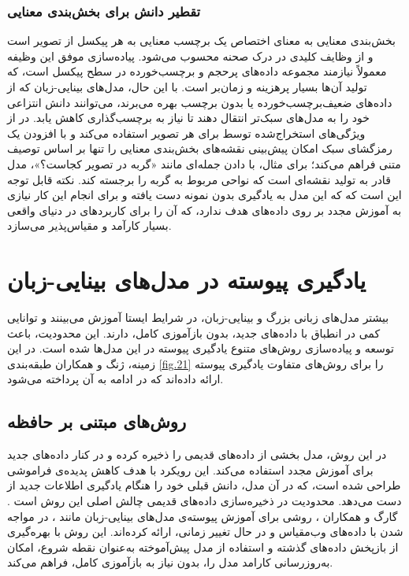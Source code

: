 \subsubsection{تقطیر دانش برای بخش‌بندی معنایی}
بخش‌بندی معنایی به معنای اختصاص یک برچسب معنایی به هر پیکسل از تصویر است و از وظایف کلیدی در درک صحنه محسوب می‌شود. پیاده‌سازی موفق این وظیفه معمولاً نیازمند مجموعه داده‌های پرحجم و برچسب‌خورده در سطح پیکسل است، که تولید آن‌ها بسیار پرهزینه و زمان‌بر است. با این حال، مدل‌های بینایی-زبان که از داده‌های ضعیف‌برچسب‌خورده یا بدون برچسب بهره می‌برند، می‌توانند دانش انتزاعی خود را به مدل‌های سبک‌تر انتقال دهند تا نیاز به برچسب‌گذاری کاهش یابد. در 
\cite{CLIPSeg}
از ویژگی‌های استخراج‌شده توسط
برای هر تصویر استفاده می‌کند و با افزودن یک رمزگشای سبک
امکان پیش‌بینی نقشه‌های بخش‌بندی معنایی را تنها بر اساس توصیف متنی
فراهم می‌کند؛ برای مثال، با دادن جمله‌ای مانند «گربه در تصویر کجاست؟»، مدل قادر به تولید نقشه‌ای است که نواحی مربوط به گربه را برجسته کند. نکته قابل توجه این است که که این مدل به یادگیری بدون نمونه دست یافته و برای انجام این کار نیازی به آموزش مجدد بر روی داده‌های هدف ندارد، که آن را برای کاربردهای در دنیای واقعی بسیار کارآمد و مقیاس‌پذیر می‌سازد.

\section{یادگیری پیوسته در مدل‌های بینایی-زبان}
بیشتر مدل‌های زبانی بزرگ و بینایی-زبان، در شرایط ایستا آموزش می‌بینند و توانایی کمی در انطباق با داده‌های جدید، بدون بازآموزی
کامل، دارند. این محدودیت، باعث توسعه و پیاده‌سازی روش‌های متنوع یادگیری پیوسته در این مدل‌ها شده است. در این زمینه، ژنگ و همکاران 
\cite{llm_continual}
طبقه‌بندی 
\cref{fig.21}
را برای روش‌های متفاوت یادگیری پیوسته ارائه داده‌اند که در ادامه به آن پرداخته می‌شود.

\subsection{روش‌های مبتنی بر حافظه}
در این روش، مدل بخشی از داده‌های قدیمی را ذخیره کرده و در کنار داده‌های جدید برای آموزش مجدد استفاده می‌کند. این رویکرد با هدف کاهش پدیده‌ی فراموشی طراحی شده است، که در آن مدل، دانش قبلی خود را هنگام یادگیری اطلاعات جدید از دست می‌دهد. محدودیت در ذخیره‌سازی داده‌های قدیمی چالش اصلی این روش‌ است
\cite{llm_continual}
.
گارگ و همکاران 
\cite{replay_clip}،
روشی برای آموزش پیوسته‌ی مدل‌های بینایی-زبان مانند 
،
در مواجه شدن با داده‌های وب‌مقیاس و در حال تغییر زمانی، ارائه کرده‌اند. این روش با بهره‌گیری از بازپخش داده‌های گذشته و استفاده از مدل پیش‌آموخته به‌عنوان نقطه شروع، امکان به‌روزرسانی کارامد مدل را، بدون نیاز به بازآموزی کامل، فراهم می‌کند.


